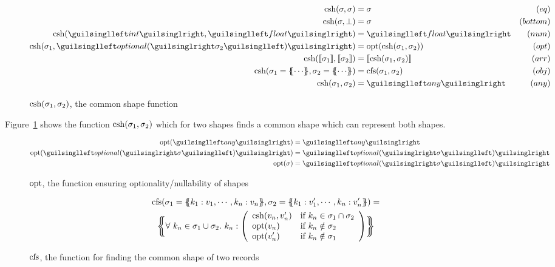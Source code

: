 \begin{figure}[ht!]
\begin{align*}
\csh(\sigma, \sigma)     &=  \sigma          & (eq) \\
\csh(\sigma, \bot)       &=  \sigma          & (bottom) \\
\csh(‹int›, ‹float›)     &= ‹float›          & (num) \\
\csh(\sigma_1, ‹optional(›\sigma_2‹)›) &= \opt(\csh(\sigma_1, \sigma_2))  & (opt) \\
\csh(\vect{\sigma_1}, \vect{\sigma_2}) &= \vect{\csh(\sigma_1, \sigma_2)} & (arr) \\
\csh(\sigma_1 = \recd{ \cdots }, \sigma_2 = \recd{ \cdots }) &= \cfs(\sigma_1, \sigma_2) & (obj) \\
\csh(\sigma_1, \sigma_2) &= ‹any›            & (any)
\end{align*}
\caption{$\operatorname{csh}(\sigma_1, \sigma_2)$, the common shape function}
\label{fig:csh}
\end{figure}

Figure~\ref{fig:csh} shows the function $\operatorname{csh}(\sigma_1, \sigma_2)$ which for two shapes finds a common shape which can represent both shapes.

\begin{figure}[ht!]
\begin{align*}
\opt(‹any›)                &= ‹any› \\
\opt(‹optional(›\sigma‹)›) &= ‹optional(›\sigma‹)› \\
\opt(\sigma)               &= ‹optional(›\sigma‹)›
\end{align*}
\caption{$\operatorname{opt}$, the function ensuring optionality/nullability of shapes}
\label{fig:opt}
\end{figure}

\begin{figure}[ht!]
\begin{gather*}
\cfs(\sigma_1 = \recd{ k_1 : v_1, \cdots, k_n : v_n }, \sigma_2 = \recd{ k_1 : v'_1, \cdots, k_n : v'_n }) = \\
\recd[\bigg]{
\forall\ k_n \in \sigma_1 \cup \sigma_2 .\ k_n : \left( \begin{array}{ll}
  \csh(v_n, v'_n) & \text{if } k_n \in \sigma_1 \cap \sigma_2 \\
  \opt(v_n) & \text{if } k_n \notin \sigma_2 \\
  \opt(v'_n) & \text{if } k_n \notin \sigma_1
\end{array} \right)
}
\end{gather*}
\caption{$\operatorname{cfs}$, the function for finding the common shape of two records}
\label{fig:cfs}
\end{figure}

